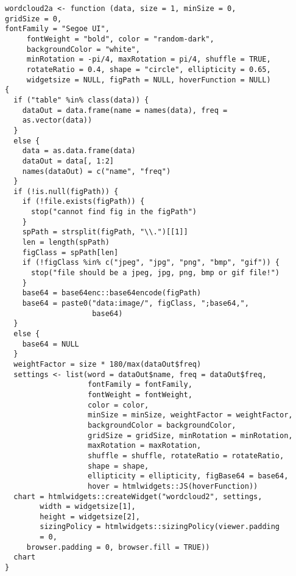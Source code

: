 \documentclass[bachelor, och, diploma ]{SCWorks}
\begin{document}
\begin{verbatim}
wordcloud2a <- function (data, size = 1, minSize = 0, 
gridSize = 0,
fontFamily = "Segoe UI",               
     fontWeight = "bold", color = "random-dark", 
     backgroundColor = "white", 
     minRotation = -pi/4, maxRotation = pi/4, shuffle = TRUE, 
     rotateRatio = 0.4, shape = "circle", ellipticity = 0.65, 
     widgetsize = NULL, figPath = NULL, hoverFunction = NULL) 
{
  if ("table" %in% class(data)) {
    dataOut = data.frame(name = names(data), freq = 
    as.vector(data))
  }
  else {
    data = as.data.frame(data)
    dataOut = data[, 1:2]
    names(dataOut) = c("name", "freq")
  }
  if (!is.null(figPath)) {
    if (!file.exists(figPath)) {
      stop("cannot find fig in the figPath")
    }
    spPath = strsplit(figPath, "\\.")[[1]]
    len = length(spPath)
    figClass = spPath[len]
    if (!figClass %in% c("jpeg", "jpg", "png", "bmp", "gif")) {
      stop("file should be a jpeg, jpg, png, bmp or gif file!")
    }
    base64 = base64enc::base64encode(figPath)
    base64 = paste0("data:image/", figClass, ";base64,", 
                    base64)
  }
  else {
    base64 = NULL
  }
  weightFactor = size * 180/max(dataOut$freq)
  settings <- list(word = dataOut$name, freq = dataOut$freq, 
                   fontFamily = fontFamily, 
                   fontWeight = fontWeight, 
                   color = color, 
                   minSize = minSize, weightFactor = weightFactor, 
                   backgroundColor = backgroundColor, 
                   gridSize = gridSize, minRotation = minRotation, 
                   maxRotation = maxRotation, 
                   shuffle = shuffle, rotateRatio = rotateRatio, 
                   shape = shape, 
                   ellipticity = ellipticity, figBase64 = base64, 
                   hover = htmlwidgets::JS(hoverFunction))
  chart = htmlwidgets::createWidget("wordcloud2", settings, 
        width = widgetsize[1], 
        height = widgetsize[2], 
        sizingPolicy = htmlwidgets::sizingPolicy(viewer.padding 
        = 0, 
     browser.padding = 0, browser.fill = TRUE))
  chart
}





\end{verbatim}
\end{document}
